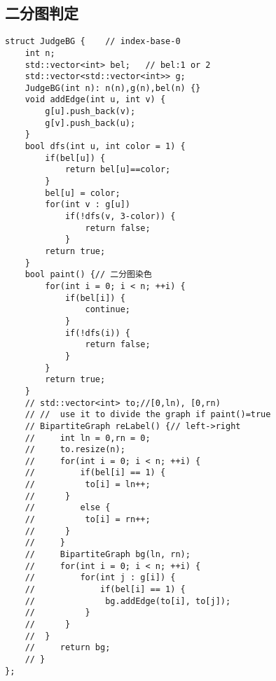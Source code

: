 \subsection{二分图判定}
\begin{lstlisting}
struct JudgeBG {	// index-base-0
    int n;
    std::vector<int> bel;	// bel:1 or 2
    std::vector<std::vector<int>> g;
    JudgeBG(int n): n(n),g(n),bel(n) {}
    void addEdge(int u, int v) {
        g[u].push_back(v);
        g[v].push_back(u);
    }
    bool dfs(int u, int color = 1) {
        if(bel[u]) {
			return bel[u]==color;
		}
        bel[u] = color;
        for(int v : g[u])
            if(!dfs(v, 3-color)) {
				return false;
			} 
        return true;
    }
    bool paint() {// 二分图染色
        for(int i = 0; i < n; ++i) {
            if(bel[i]) {
				continue;
			}
            if(!dfs(i)) {
				return false;
			}
        }
        return true;
    }
    // std::vector<int> to;//[0,ln), [0,rn)
    // //  use it to divide the graph if paint()=true
    // BipartiteGraph reLabel() {// left->right
    //     int ln = 0,rn = 0;
    //     to.resize(n);
    //     for(int i = 0; i < n; ++i) {
    //         if(bel[i] == 1) {
	// 			to[i] = ln++;
	// 		}
    //         else {
	// 			to[i] = rn++;
	// 		}
    //     }
    //     BipartiteGraph bg(ln, rn);
    //     for(int i = 0; i < n; ++i) {
    //         for(int j : g[i]) {
    //             if(bel[i] == 1) {
	// 				bg.addEdge(to[i], to[j]); 
	// 			}
	// 		}
	// 	}
    //     return bg;
    // }
};
\end{lstlisting}

